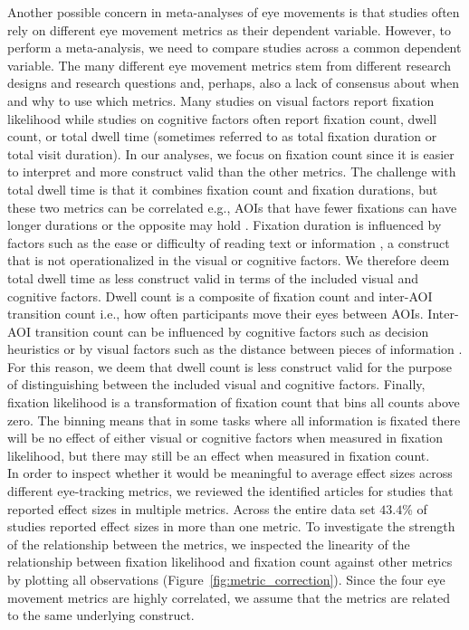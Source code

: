 Another possible concern in meta-analyses of eye movements is that studies often rely on different eye movement metrics as their dependent variable. However, to perform a meta-analysis, we need to compare studies across a common dependent variable. The many different eye movement metrics stem from different research designs and research questions and, perhaps, also a lack of consensus about when and why to use which metrics. Many studies on visual factors report fixation likelihood while studies on cognitive factors often report fixation count, dwell count, or total dwell time (sometimes referred to as total fixation duration or total visit duration). In our analyses, we focus on fixation count since it is easier to interpret and more construct valid than the other metrics. The challenge with total dwell time is that it combines fixation count and fixation durations, but these two metrics can be correlated e.g., AOIs that have fewer fixations can have longer durations or the opposite may hold \citep{orquin2018a}. Fixation duration is influenced by factors such as the ease or difficulty of reading text or information \citep{rayner2009}, a construct that is not operationalized in the visual or cognitive factors. We therefore deem total dwell time as less construct valid in terms of the included visual and cognitive factors. Dwell count is a composite of fixation count and inter-AOI transition count i.e., how often participants move their eyes between AOIs. Inter-AOI transition count can be influenced by cognitive factors such as decision heuristics \citep{schoemann2019} or by visual factors such as the distance between pieces of information \citep{perkovic2018}. For this reason, we deem that dwell count is less construct valid for the purpose of distinguishing between the included visual and cognitive factors. Finally, fixation likelihood is a transformation of fixation count that bins all counts above zero. The binning means that in some tasks where all information is fixated there will be no effect of either visual or cognitive factors when measured in fixation likelihood, but there may still be an effect when measured in fixation count. \\

In order to inspect whether it would be meaningful to average effect sizes across different eye-tracking metrics, we reviewed the identified articles for studies that reported effect sizes in multiple metrics. Across the entire data set $43.4$\% of studies reported effect sizes in more than one metric. To investigate the strength of the relationship between the metrics, we inspected the linearity of the relationship between fixation likelihood and fixation count against other metrics by plotting all observations (Figure~\ref{fig:metric_correction}). Since the four eye movement metrics are highly correlated, we assume that the metrics are related to the same underlying construct.\\ 

